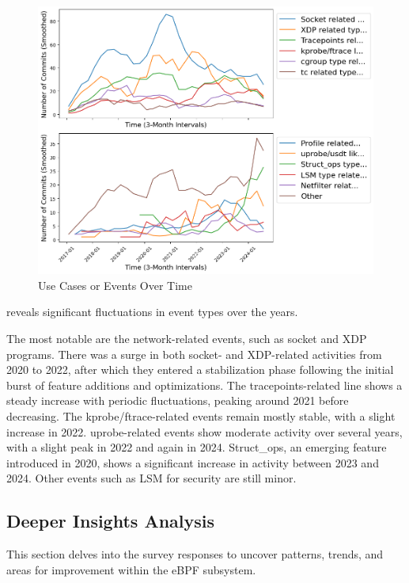 \begin{figure}[ht]
    \centering
    \includegraphics[width=\linewidth]{feature-analysis/timeline_usecases_or_submodule_events_smoothed.png}
    \caption{Use Cases or Events Over Time }\label{fig:timeline_usecases_or_submodule_events_smoothed}
\end{figure}

 reveals significant fluctuations in event types over the years.

The most notable are the network-related events, such as socket and XDP programs. There was a surge in both socket- and XDP-related activities from 2020 to 2022, after which they entered a stabilization phase following the initial burst of feature additions and optimizations. The tracepoints-related line shows a steady increase with periodic fluctuations, peaking around 2021 before decreasing. The kprobe/ftrace-related events remain mostly stable, with a slight increase in 2022. uprobe-related events show moderate activity over several years, with a slight peak in 2022 and again in 2024. Struct\_ops, an emerging feature introduced in 2020, shows a significant increase in activity between 2023 and 2024. Other events such as LSM for security are still minor.

\subsection{Deeper Insights Analysis}

This section delves into the survey responses to uncover patterns, trends, and areas for improvement within the eBPF subsystem.
